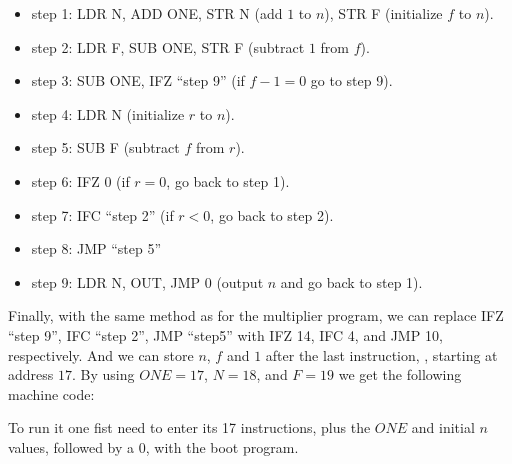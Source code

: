 \begin{itemize}
  \item step 1: LDR N, ADD ONE, STR N (add $1$ to $n$), STR F (initialize $f$
  to $n$).

  \item step 2: LDR F, SUB ONE, STR F (subtract $1$ from $f$).

  \item step 3: SUB ONE, IFZ ``step 9'' (if $f-1=0$ go to step 9).

  \item step 4: LDR N (initialize $r$ to $n$).

  \item step 5: SUB F (subtract $f$ from $r$).

  \item step 6: IFZ 0 (if $r=0$, go back to step 1).

  \item step 7: IFC ``step 2'' (if $r<0$, go back to step 2).

  \item step 8: JMP ``step 5''

  \item step 9: LDR N, OUT, JMP 0 (output $n$ and go back to step 1).
\end{itemize}

Finally, with the same method as for the multiplier program, we can replace IFZ
``step 9'', IFC ``step 2'', JMP ``step5'' with IFZ 14, IFC 4, and JMP 10,
respectively. And we can store $n$, $f$ and $1$ after the last instruction,
\ie, starting at address $17$. By using $\mathit{ONE}=17$, $N=18$, and $F=19$
we get the following machine code:



To run it one fist need to enter its 17 instructions, plus the $\mathit{ONE}$
and initial $n$ values, followed by a $0$, with the boot program.

